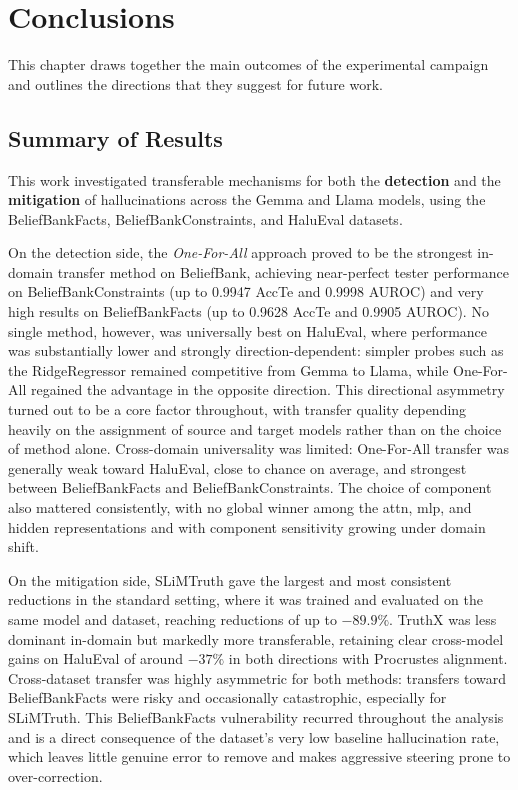 \chapter{Conclusions}

This chapter draws together the main outcomes of the experimental campaign and outlines the directions that they suggest for future work.

\section{Summary of Results}
This work investigated transferable mechanisms for both the \textbf{detection} and the \textbf{mitigation} of hallucinations across the Gemma and Llama models, using the BeliefBankFacts, BeliefBankConstraints, and HaluEval datasets.

On the detection side, the \textit{One-For-All} approach proved to be the strongest in-domain transfer method on BeliefBank, achieving near-perfect tester performance on BeliefBankConstraints (up to 0.9947 AccTe and 0.9998 AUROC) and very high results on BeliefBankFacts (up to 0.9628 AccTe and 0.9905 AUROC). No single method, however, was universally best on HaluEval, where performance was substantially lower and strongly direction-dependent: simpler probes such as the RidgeRegressor remained competitive from Gemma to Llama, while One-For-All regained the advantage in the opposite direction. This directional asymmetry turned out to be a core factor throughout, with transfer quality depending heavily on the assignment of source and target models rather than on the choice of method alone. Cross-domain universality was limited: One-For-All transfer was generally weak toward HaluEval, close to chance on average, and strongest between BeliefBankFacts and BeliefBankConstraints. The choice of component also mattered consistently, with no global winner among the attn, mlp, and hidden representations and with component sensitivity growing under domain shift.

On the mitigation side, SLiMTruth gave the largest and most consistent reductions in the standard setting, where it was trained and evaluated on the same model and dataset, reaching reductions of up to $-89.9\%$. TruthX was less dominant in-domain but markedly more transferable, retaining clear cross-model gains on HaluEval of around $-37\%$ in both directions with Procrustes alignment. Cross-dataset transfer was highly asymmetric for both methods: transfers toward BeliefBankFacts were risky and occasionally catastrophic, especially for SLiMTruth. This BeliefBankFacts vulnerability recurred throughout the analysis and is a direct consequence of the dataset's very low baseline hallucination rate, which leaves little genuine error to remove and makes aggressive steering prone to over-correction.

